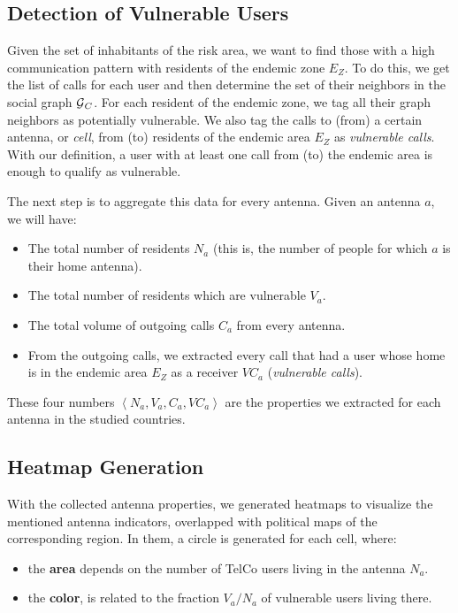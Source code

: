 \subsection{Detection of Vulnerable Users}\label{subsection:vulnerable_users_detection}

Given the set of inhabitants of the risk area, we want to find those with a high communication pattern with residents of the endemic zone $E_Z$.
To do this, we get the list of calls for each user and then determine the set of their neighbors in the social graph $\operatorname{\mathcal{G}}_C$.
For each resident of the endemic zone, we tag all their graph neighbors as potentially vulnerable.
We also tag the calls to (from) a certain antenna, or \textit{cell}, from (to) residents of the endemic area $E_Z$ as \textit{vulnerable calls}.
With our definition, a user with at least one call from (to) the endemic area is enough to qualify as vulnerable.

The next step is to aggregate this data for every antenna.
Given an antenna $a$, we will have:
\begin{itemize}
	\item The total number of residents $N_a$ (this is, the number of people for which $a$ is their home antenna).
	\item The total number of residents which are vulnerable $V_a$.
	\item The total volume of outgoing calls $C_a$ from every antenna.
	\item From the outgoing calls, we extracted every call that had a user whose home is in the endemic area $E_Z$ as a receiver $VC_a$ (\textit{vulnerable calls}).
\end{itemize}

These four numbers $\left< N_a, V_a, C_a, VC_a \right>$ are the properties we extracted for each antenna in the studied countries.

\subsection{Heatmap Generation}
With the collected antenna properties, we generated heatmaps to visualize the mentioned antenna indicators, overlapped with political maps of the corresponding region.
In them, a circle is generated for each cell, where:

\begin{itemize}
	\item the \textbf{area} depends on the number of TelCo users living in the antenna $N_a$.

	\item the \textbf{color}, is related to the fraction ${V_a}/{N_a}$ of vulnerable users living there.
\end{itemize}


